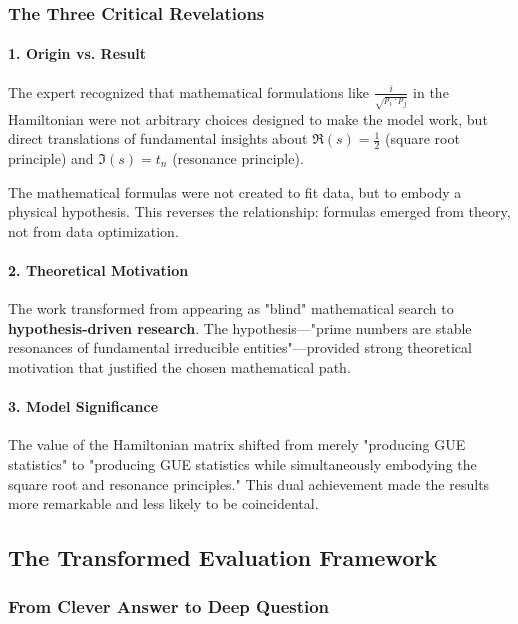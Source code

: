 \subsubsection{The Three Critical Revelations}

\paragraph{1. Origin vs. Result}
The expert recognized that mathematical formulations like $\frac{i}{\sqrt{p_i \cdot p_j}}$ in the Hamiltonian were not arbitrary choices designed to make the model work, but direct translations of fundamental insights about $\Re(s) = \frac{1}{2}$ (square root principle) and $\Im(s) = t_n$ (resonance principle).

\begin{insight}
The mathematical formulas were not created to fit data, but to embody a physical hypothesis. This reverses the relationship: formulas emerged from theory, not from data optimization.
\end{insight}

\paragraph{2. Theoretical Motivation}
The work transformed from appearing as "blind" mathematical search to \textbf{hypothesis-driven research}. The hypothesis—"prime numbers are stable resonances of fundamental irreducible entities"—provided strong theoretical motivation that justified the chosen mathematical path.

\paragraph{3. Model Significance}
The value of the Hamiltonian matrix shifted from merely "producing GUE statistics" to "producing GUE statistics while simultaneously embodying the square root and resonance principles." This dual achievement made the results more remarkable and less likely to be coincidental.

\subsection{The Transformed Evaluation Framework}

\subsubsection{From Clever Answer to Deep Question}


